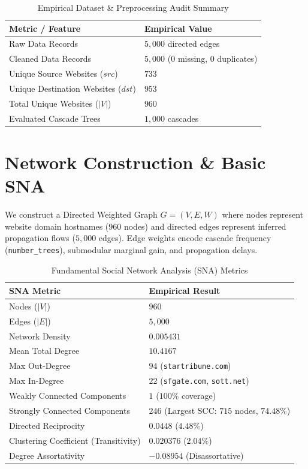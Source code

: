 \documentclass[10pt,journal,compsoc]{IEEEtran}
\begin{document}
\begin{table}[h]
\caption{Empirical Dataset & Preprocessing Audit Summary}
\label{tab:dataset_summary}
\centering
\begin{tabular}{ll}
\toprule
\textbf{Metric / Feature} & \textbf{Empirical Value} \\
\midrule
Raw Data Records & $5,000$ directed edges \\
Cleaned Data Records & $5,000$ (0 missing, 0 duplicates) \\
Unique Source Websites ($src$) & $733$ \\
Unique Destination Websites ($dst$) & $953$ \\
Total Unique Websites ($|V|$) & $960$ \\
Evaluated Cascade Trees & $1,000$ cascades \\
\bottomrule
\end{tabular}
\end{table}

\section{Network Construction \& Basic SNA}
We construct a Directed Weighted Graph $G = (V, E, W)$ where nodes represent website domain hostnames ($960$ nodes) and directed edges represent inferred propagation flows ($5,000$ edges). Edge weights encode cascade frequency (\texttt{number\_trees}), submodular marginal gain, and propagation delays.

\begin{table}[h]
\caption{Fundamental Social Network Analysis (SNA) Metrics}
\label{tab:network_metrics}
\centering
\begin{tabular}{ll}
\toprule
\textbf{SNA Metric} & \textbf{Empirical Result} \\
\midrule
Nodes ($|V|$) & $960$ \\
Edges ($|E|$) & $5,000$ \\
Network Density & $0.005431$ \\
Mean Total Degree & $10.4167$ \\
Max Out-Degree & $94$ (\texttt{startribune.com}) \\
Max In-Degree & $22$ (\texttt{sfgate.com}, \texttt{sott.net}) \\
Weakly Connected Components & $1$ ($100\%$ coverage) \\
Strongly Connected Components & $246$ (Largest SCC: $715$ nodes, $74.48\%$) \\
Directed Reciprocity & $0.0448$ ($4.48\%$) \\
Clustering Coefficient (Transitivity) & $0.020376$ ($2.04\%$) \\
Degree Assortativity & $-0.08954$ (Disassortative) \\
\bottomrule
\end{tabular}
\end{table}
\end{document}
